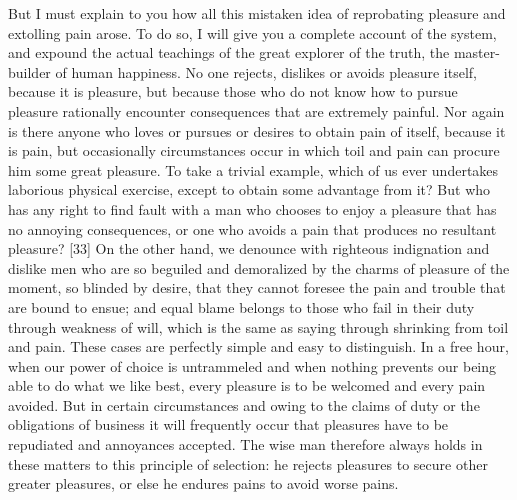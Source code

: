 But I must explain to you how all this mistaken idea of reprobating pleasure and extolling pain arose. To do so, I will give you a complete account of the system, and expound the actual teachings of the great explorer of the truth, the master-builder of human happiness. No one rejects, dislikes or avoids pleasure itself, because it is pleasure, but because those who do not know how to pursue pleasure rationally encounter consequences that are extremely painful. Nor again is there anyone who loves or pursues or desires to obtain pain of itself, because it is pain, but occasionally circumstances occur in which toil and pain can procure him some great pleasure. To take a trivial example, which of us ever undertakes laborious physical exercise, except to obtain some advantage from it? But who has any right to find fault with a man who chooses to enjoy a pleasure that has no annoying consequences, or one who avoids a pain that produces no resultant pleasure? [33] On the other hand, we denounce with righteous indignation and dislike men who are so beguiled and demoralized by the charms of pleasure of the moment, so blinded by desire, that they cannot foresee the pain and trouble that are bound to ensue; and equal blame belongs to those who fail in their duty through weakness of will, which is the same as saying through shrinking from toil and pain. These cases are perfectly simple and easy to distinguish. In a free hour, when our power of choice is untrammeled and when nothing prevents our being able to do what we like best, every pleasure is to be welcomed and every pain avoided. But in certain circumstances and owing to the claims of duty or the obligations of business it will frequently occur that pleasures have to be repudiated and annoyances accepted. The wise man therefore always holds in these matters to this principle of selection: he rejects pleasures to secure other greater pleasures, or else he endures pains to avoid worse pains.

